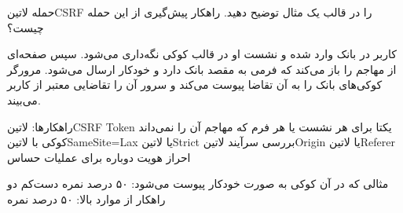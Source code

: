 
حمله ‌لاتین{CSRF} را در قالب یک مثال توضیح دهید. راهکار پیش‌گیری از این حمله چیست؟


\begin{پاسخ}

کاربر در بانک وارد شده و نشست او در قالب کوکی نگه‌داری می‌شود.
سپس صفحه‌ای از مهاجم را باز می‌کند که فرمی به مقصد بانک دارد و خودکار ارسال می‌شود.
مرورگر کوکی‌های بانک را به آن تقاضا پیوست می‌کند و سرور آن را تقاضایی معتبر از کاربر می‌بیند.

راهکارها:
 ‌لاتین{CSRF Token} یکتا برای هر نشست یا هر فرم که مهاجم آن را نمی‌داند
 کوکی با ‌لاتین{SameSite=Lax} یا ‌لاتین{Strict}
 بررسی سرآیند ‌لاتین{Origin} یا ‌لاتین{Referer}
 احراز هویت دوباره برای عملیات حساس

 مثالی که در آن کوکی به صورت خودکار پیوست می‌شود: ۵۰ درصد نمره
 دست‌کم دو راهکار از موارد بالا: ۵۰ درصد نمره

\end{پاسخ}
